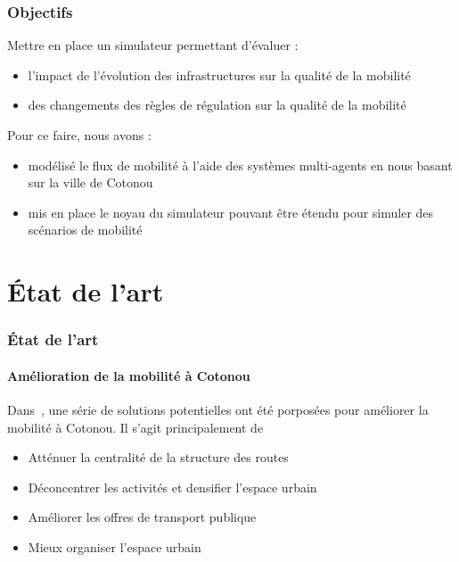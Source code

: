 \begin{frame}
    \frametitle{Objectifs}
    Mettre en place un simulateur permettant d'évaluer :
    \begin{itemize}
        \item l'impact de l'évolution des infrastructures sur la qualité de la mobilité
        \item des changements des règles de régulation sur la qualité de la mobilité
    \end{itemize}
    \pause{}%
    Pour ce faire, nous avons :
    \begin{itemize}
        \item modélisé le flux de mobilité à l'aide des systèmes multi-agents en nous basant sur la ville de Cotonou
        \item mis en place le noyau du simulateur pouvant être étendu pour simuler des scénarios de mobilité
    \end{itemize}
\end{frame}


\section{État de l'art}\label{sec:etat_art}
\begin{frame}
    \frametitle{État de l'art}
    \framesubtitle{Amélioration de la mobilité à Cotonou}

    Dans~\autocite{adonon_problematique}, une série de solutions potentielles ont été porposées pour améliorer la mobilité à Cotonou.
    Il s'agit principalement de

    \begin{itemize}
        \item Atténuer la centralité de la structure des routes
        \item Déconcentrer les activités et densifier l'espace urbain
        \item Améliorer les offres de transport publique
        \item Mieux organiser l'espace urbain
    \end{itemize}
\end{frame}

